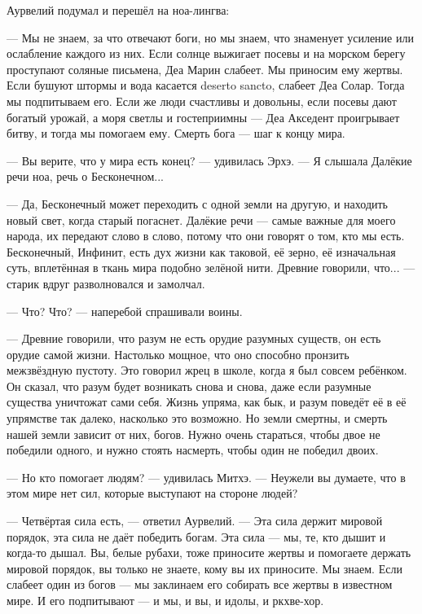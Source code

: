 Аурвелий подумал и перешёл на ноа-лингва:

--- Мы не знаем, за что отвечают боги, но мы знаем, что знаменует усиление или ослабление каждого из них.
Если солнце выжигает посевы и на морском берегу проступают соляные письмена, Деа Марин слабеет.
Мы приносим ему жертвы.
Если бушуют штормы и вода касается deserto sancto\FM, слабеет Деа Солар.
Тогда мы подпитываем его.
Если же люди счастливы и довольны, если посевы дают богатый урожай, а моря светлы и гостеприимны --- Деа Акседент проигрывает битву, и тогда мы помогаем ему.
Смерть бога --- шаг к концу мира.

--- Вы верите, что у мира есть конец? --- удивилась Эрхэ.
--- Я слышала Далёкие речи ноа, речь о Бесконечном...

--- Да, Бесконечный может переходить с одной земли на другую, и находить новый свет, когда старый погаснет.
Далёкие речи --- самые важные для моего народа, их передают слово в слово, потому что они говорят о том, кто мы есть.
Бесконечный, Инфинит, есть дух жизни как таковой, её зерно, её изначальная суть, вплетённая в ткань мира подобно зелёной нити.
Древние говорили, что... --- старик вдруг разволновался и замолчал.

--- Что? Что? --- наперебой спрашивали воины.

--- Древние говорили, что разум не есть орудие разумных существ, он есть орудие самой жизни.
Настолько мощное, что оно способно пронзить межзвёздную пустоту.
Это говорил жрец в школе, когда я был совсем ребёнком.
Он сказал, что разум будет возникать снова и снова, даже если разумные существа уничтожат сами себя.
Жизнь упряма, как бык, и разум поведёт её в её упрямстве так далеко, насколько это возможно.
Но земли смертны, и смерть нашей земли зависит от них, богов.
Нужно очень стараться, чтобы двое не победили одного, и нужно стоять насмерть, чтобы один не победил двоих.

--- Но кто помогает людям? --- удивилась Митхэ.
--- Неужели вы думаете, что в этом мире нет сил, которые выступают на стороне людей?

--- Четвёртая сила есть, --- ответил Аурвелий.
--- Эта сила держит мировой порядок, эта сила не даёт победить богам.
Эта сила --- мы, те, кто дышит и когда-то дышал.
Вы, белые рубахи, тоже приносите жертвы и помогаете держать мировой порядок, вы только не знаете, кому вы их приносите.
Мы знаем.
Если слабеет один из богов --- мы заклинаем его собирать все жертвы в известном мире.
И его подпитывают --- и мы, и вы, и идолы, и ркхве-хор.

